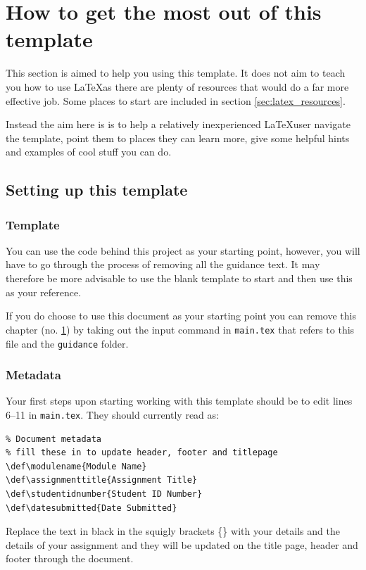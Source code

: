 \chapter{How to get the most out of this template} \label{cha:how-to-template}
This section is aimed to help you using this template. It does not aim to teach you how to use \LaTeX as there are plenty of resources that would do a far more effective job. Some places to start are included in section \ref{sec:latex_resources}.

Instead the aim here is is to help a relatively inexperienced \LaTeX user navigate the template, point them to places they can learn more, give some helpful hints and examples of cool stuff you can do.

\section{Setting up this template}

\subsection{Template}
You can use the code behind this project as your starting point, however, you will have to go through the process of removing all the guidance text. It may therefore be more advisable to use the blank template to start and then use this as your reference.

If you do choose to use this document as your starting point you can remove this chapter (no. \ref{cha:how-to-template}) by taking out the input command in \verb|main.tex| that refers to this file and the \verb|guidance| folder.

\subsection{Metadata}
Your first steps upon starting working with this template should be to edit lines \numrange{6}{11} in \verb|main.tex|. They should currently read as:

\begin{verbatim}
% Document metadata
% fill these in to update header, footer and titlepage
\def\modulename{Module Name}
\def\assignmenttitle{Assignment Title}
\def\studentidnumber{Student ID Number}
\def\datesubmitted{Date Submitted}
\end{verbatim}

Replace the text in black in the squigly brackets \{\} with your details and the details of your assignment and they will be updated on the title page, header and footer through the document.

